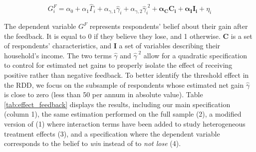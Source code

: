\documentclass[12pt]{article} %
\begin{document}
\begin{equation}
    G_i^F = \alpha_0 + \alpha_1 \widehat{\Gamma}_{i} + \alpha_{\gamma,1} \widehat{\gamma}_{i} + \alpha_{\gamma,2} \widehat{\gamma}_{i}^{\;2} + \mathbf{\alpha_C C_i} + \mathbf{\alpha_I I_i} + \eta_i
    \label{eq:effect_feedback}
\end{equation}

The dependent variable $G^F$ represents respondents' belief about their gain after the feedback. It is equal to 0 if they believe they lose, and 1 otherwise. $\mathbf{C}$ is a set of respondents' characteristics, and $\mathbf{I}$ a set of variables describing their household's income. The two terms $\widehat{\gamma}$ and $\widehat{\gamma}^{\;2}$ allow for a quadratic specification to control for estimated net gains to properly isolate the effect of receiving positive rather than negative feedback. To better identify the threshold effect in the RDD, we focus on the subsample of respondents whose estimated net gain $\widehat{\gamma}$ is close to zero (less than 50\euros{} per annum in absolute value). Table \ref{tab:effect_feedback} displays the results, including our main specification (column 1), the same estimation performed on the full sample (2), a modified version of (1) where interaction terms have been added to study heterogeneous treatment effects (3), and a specification where the dependent variable corresponds to the belief to \textit{win} instead of to \textit{not lose} (4).
\end{document}
